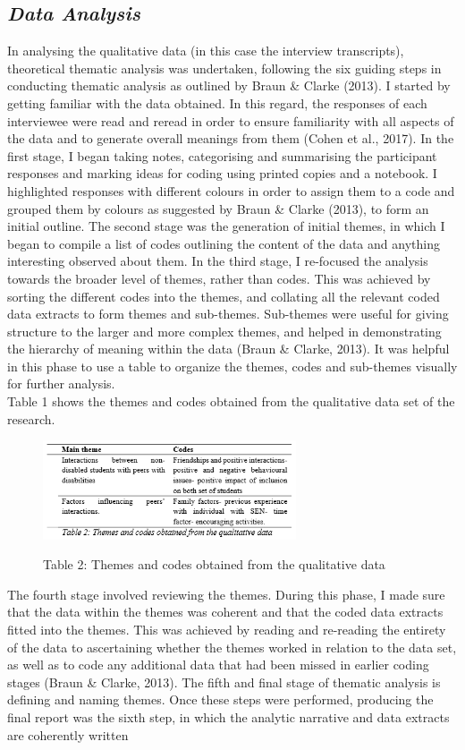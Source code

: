 \documentclass[11pt]{sig-alternate}
\begin{document}
\begin{large}
\section*{\textit{Data Analysis}}
In analysing the qualitative data (in this case the interview transcripts), theoretical thematic analysis was undertaken, following the six guiding steps in conducting thematic analysis as outlined by Braun \& Clarke (2013). I started by getting familiar with the data obtained. In this regard, the responses of each interviewee were read and reread in order to ensure familiarity with all aspects of the data and to generate overall meanings from them (Cohen et al., 2017). In the first stage, I began taking notes, categorising and summarising the participant responses and marking ideas for coding using printed copies and a notebook. I highlighted responses with different colours in order to assign them to a code and grouped them by colours as suggested by Braun \& Clarke (2013), to form an initial outline. The second stage was the generation of initial themes, in which I began to compile a list of codes outlining the content of the data and anything interesting observed about them. In the third stage, I re-focused the analysis towards the broader level of themes, rather than codes. This was achieved by sorting the different codes into the themes, and collating all the relevant coded data extracts to form themes and sub-themes. Sub-themes were useful for giving structure to the larger and more complex themes, and helped in demonstrating the hierarchy of meaning within the data (Braun \& Clarke, 2013). It was helpful in this phase to use a table to organize the themes, codes and sub-themes visually for further analysis. \\Table 1 shows the themes and codes obtained from the qualitative data set of the research. 

{\begin{figure}[htp] 
    \leftmargin
    \caption*{Table 2: Themes and codes obtained from the qualitative data}
    \includegraphics[width=7.5cm]{table 2.png}
    \label{Themes and codes obtained from the qualitative data}
\end{figure}

The fourth stage involved reviewing the themes. During this phase, I made sure that the data within the themes was coherent and that the coded data extracts fitted into the themes. This was achieved by reading and re-reading the entirety of the data to ascertaining whether the themes worked in relation to the data set, as well as to code any additional data that had been missed in earlier coding stages (Braun \& Clarke, 2013). The fifth and final stage of thematic analysis is defining and naming themes. Once these steps were performed, producing the final report was the sixth step, in which the analytic narrative and data extracts are coherently written

}
\end{large}
\end{document}
